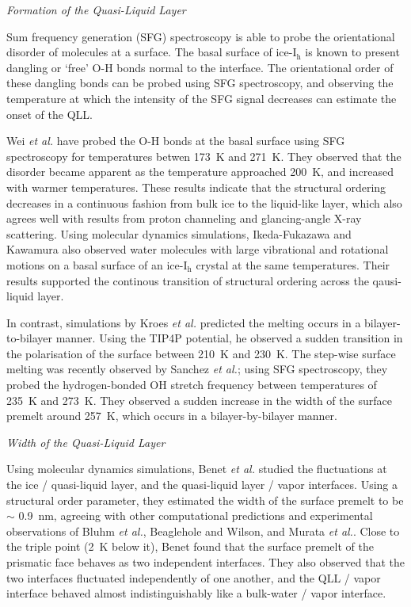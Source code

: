 \begin{flushleft}
\textit{Formation of the Quasi-Liquid Layer}
\end{flushleft}

Sum frequency generation (SFG) spectroscopy is able to probe the
orientational disorder of molecules at a surface. The basal surface of
ice-I$_\mathrm{h}$ is known to present dangling or `free' O-H bonds
normal to the interface. The orientational order of these dangling
bonds can be probed using SFG spectroscopy, and observing the
temperature at which the intensity of the SFG signal decreases can
estimate the onset of the QLL.

Wei \textit{et al.} have probed the O-H bonds at the basal surface
using SFG spectroscopy for temperatures betwen 173~K and
271~K.\cite{Wei2001,Wei2002} They observed that the disorder became
apparent as the temperature approached 200~K, and increased with
warmer temperatures.  These results indicate that the structural
ordering decreases in a continuous fashion from bulk ice to the
liquid-like layer, which also agrees well with results from proton
channeling and glancing-angle X-ray
scattering.\cite{Golecki1978,Dosch1995} Using molecular dynamics
simulations, Ikeda-Fukazawa and Kawamura also observed water molecules
with large vibrational and rotational motions on a basal surface of an
ice-I$_\mathrm{h}$ crystal at the same
temperatures.\cite{Ikeda-Fukazawa2004} Their results supported the
continous transition of structural ordering across the qausi-liquid
layer.

In contrast, simulations by Kroes \textit{et al.}  predicted the
melting occurs in a bilayer-to-bilayer manner.\cite{Kroes1992} Using
the TIP4P potential, he observed a sudden transition in the
polarisation of the surface between 210~K and 230~K.  The step-wise
surface melting was recently observed by Sanchez \textit{et al.};
using SFG spectroscopy, they probed the hydrogen-bonded OH stretch
frequency between temperatures of 235~K and 273~K.\cite{Sanchez2017}
They observed a sudden increase in the width of the surface premelt
around 257~K, which occurs in a bilayer-by-bilayer manner. 

\begin{flushleft}
\textit{Width of the Quasi-Liquid Layer}
\end{flushleft}

Using molecular dynamics simulations, Benet \textit{et al.} studied
the fluctuations at the ice / quasi-liquid layer, and the quasi-liquid
layer / vapor interfaces.\cite{Benet2016} Using a structural order
parameter, they estimated the width of the surface premelt to be
$\sim$ 0.9~nm, agreeing with other computational
predictions\cite{Conde2008,Bishop2009,Pan2011} and experimental
observations of Bluhm \textit{et al.}\cite{Bluhm2002}, Beaglehole and
Wilson\cite{Bealgehole1993}, and Murata \textit{et
  al.}\cite{Murata2015}. Close to the triple point (2~K below it),
Benet found that the surface premelt of the prismatic face behaves as
two independent interfaces. They also observed that the two interfaces
fluctuated independently of one another, and the QLL / vapor interface
behaved almost indistinguishably like a bulk-water / vapor interface.

